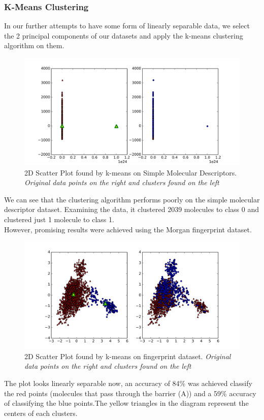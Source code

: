 \documentclass[a4paper,12pt]{report}
\begin{document}
			\subsubsection{K-Means Clustering}
			In our further attempts to have some form of linearly separable data, we select the 2 principal components of our datasets and apply the k-means clustering algorithm on them.
			\begin{figure}[H]
				\centering
				\includegraphics[width=\textwidth,scale=1,totalheight=0.4\textheight]{images/kmeans_smd_scatter}
				\caption{2D Scatter Plot found by k-means on Simple Molecular Descriptors. \textit{Original data points on the right and clusters found on the left}}
				\label{fig:kmeans_smd_scatter}
			\end{figure}
			We can see that the clustering algorithm performs poorly on the simple molecular descriptor dataset. Examining the data, it clustered 2039 molecules to class 0 and clustered just 1 molecule to class 1. \\
			However, promising results were achieved using the Morgan fingerprint dataset.
			\begin{figure}[H]
				\centering
				\includegraphics[width=\textwidth,scale=1,totalheight=0.4\textheight]{images/kmeans_morgan_scatter}
				\caption{2D Scatter Plot found by k-means on fingerprint dataset. \textit{Original data points on the right and clusters found on the left}}
				\label{fig:kmeans_morgan_scatter}
			\end{figure}
			The plot looks linearly separable now, an accuracy of 84\% was achieved classify the red points (molecules that pass through the barrier (A)) and a 59\% accuracy of classifying the blue points.The yellow triangles in the diagram represent the centers of each clusters.
\end{document}
